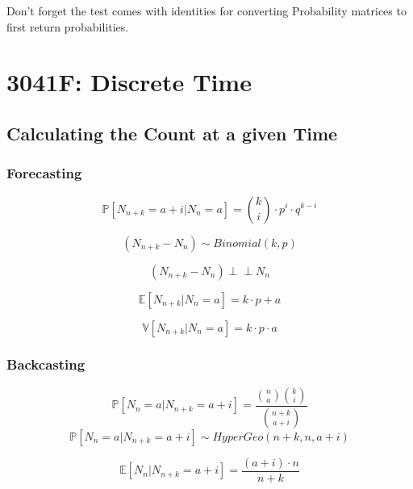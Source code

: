 \documentclass[12pt]{article}
\newcommand{\indep}{\perp \!\!\! \perp}
\begin{document}
    Don't forget the test comes with identities for converting Probability matrices to first return probabilities.
\section{3041F: Discrete Time}
    \subsection{Calculating the Count at a given Time}
    \subsubsection{Forecasting}
    \begin{equation}
        \mathbb{P}[N_{n+k} = a + i | N_n = a] = 
        \binom{k}{i} \cdot p^i \cdot q^{k-i}
    \end{equation}

    \begin{equation}
        (N_{n+k} - N_n) \sim Binomial(k, p)
    \end{equation}

    \begin{equation}
        (N_{n+k} - N_n) \indep N_n
    \end{equation}

    \begin{equation}
        \mathbb{E}[N_{n+k} | N_n = a] = k \cdot p + a
    \end{equation}

    \begin{equation}
        \mathbb{V}[N_{n+k} | N_n = a] = k \cdot p \cdot a
    \end{equation}

    \subsubsection{Backcasting}
    \begin{equation}
        \mathbb{P}[N_n = a | N_{n+k} = a + i] = 
        \frac{
            \binom{n}{a} \binom{k}{i}
        }{
            \binom{n+k}{a+i}
        }
    \end{equation}
    \begin{equation}
        \mathbb{P}[N_n = a | N_{n+k} = a + i] \sim HyperGeo(n+k, n, a+i)
    \end{equation}

    \begin{equation}
        \mathbb{E}[N_n | N_{n+k} = a + i] = \frac{(a + i) \cdot n}{n + k}
    \end{equation}
\end{document}
